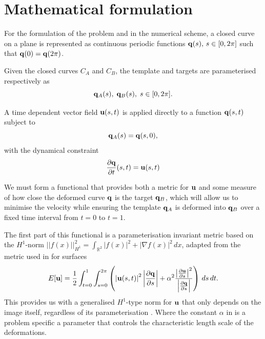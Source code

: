 \documentclass[a4paper, 12pt]{article}
\begin{document}
\section{Mathematical formulation \label{sec:equations}}

For the formulation of the problem and in the numerical scheme, a closed curve
on a plane is represented as continuous periodic functions $\mathbf{q}(s),\, s \in
[0,2\pi]$ such that $\mathbf{q}(0) = \mathbf{q}(2\pi)$.

Given the closed curves $C_{A}$ and $C_B$, the template and targets are
parameterised respectively as
\begin{equation}
  \label{eq:qAqB}
  \mathbf{q}_{A}(s),\; \mathbf{q}_{B}(s),\; s \in [0,2\pi].
\end{equation}

A time dependent vector field $\mathbf{u}(s,t)$ is applied directly to a function
$\mathbf{q}(s,t)$ subject to
\begin{equation}
  \mathbf{q}_A(s) =\mathbf{q}(s,0),   \label{eq:template}
\end{equation}
with the dynamical constraint
\begin{equation}
  \frac{\partial \mathbf{q}}{\partial t}(s,t) = \mathbf{u}(s,t)\label{eq:dqdt}
\end{equation}

We must form a functional that provides both a metric for $\mathbf{u}$ and some
measure of how close the deformed curve $\mathbf{q}$ is the target $\mathbf{q}_B$,
which will allow us to minimise the velocity while ensuring the template  $\mathbf{q}_A$ is deformed into $\mathbf{q}_B$ over a fixed time interval from $t=0$ to $t=1$. 

The first part of this functional is a parameterisation invariant metric based
on the $H^1$-norm $||f(x)||^2_{H^1} = \int_{\mathbb{R}^2} |f(x)|^2 + |\nabla
f(x)|^2\,dx$, adapted from the metric used in \cite{bauer2011new} for surfaces
\begin{equation}
  \label{eq:metric}
  E[\mathbf{u}] = \frac{1}{2} \int^{1}_{t=0} \int^{2\pi}_{s=0}\left( \left| \mathbf{u}(s,t) \right|^2 
  \left| \frac{\partial \mathbf{q}}{\partial s} \right|  + 
  \alpha^2 \frac{ 
    \left| \frac{\partial \mathbf{u}}{\partial s}\right|^2}{
    \left| \frac{\partial \mathbf{q}}{\partial s}\right|}\right)  \,ds\,dt.
\end{equation}
This provides us with a generalised $H^1$-type norm for $\mathbf{u}$ that only
depends on the image itself, regardless of its parameterisation
\cite{bauer2011new}.  Where the constant $\alpha$ in  is a problem
specific a parameter that controls the characteristic length scale of the
deformations.
\end{document}
